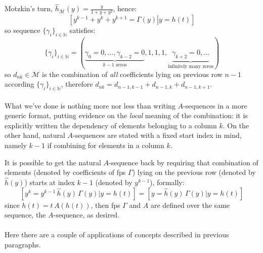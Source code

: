 Motzkin's turn, 
$\hat{h}_{\mathcal{M}}(y) = \frac{y}{1+y+y^2}$, hence:
\begin{displaymath}
        \left.\left[y^{k-1}+y^{k}+y^{k+1}=\Gamma(y)\right| y = h(t) \right]
\end{displaymath}
so sequence $\lbrace \gamma_{i} \rbrace_{i\in\mathbb{N}}$ satisfies:
\begin{displaymath}
    \lbrace \gamma_{i} \rbrace_{i\in\mathbb{N}} = 
        \left(\underbrace{\gamma_{0}=0,\ldots,\gamma_{k-2}=0}_{k-1 \text{ zeros}},
            1,1,1,
            \underbrace{\gamma_{k+2}=0, \ldots}_{\text{infinitely many zeros}} \right)
\end{displaymath}
so $d_{nk}\in\mathcal{M}$ is the combination of \emph{all} coefficients
lying on previous row $n-1$ according $\lbrace \gamma_{i} \rbrace_{i\in\mathbb{N}}$,
therefore $d_{nk}=d_{n-1,k-1}+d_{n-1,k}+d_{n-1,k+1}$.
\\\\
What we've done is nothing more nor less than writing $A$-sequences 
in a more generic format, putting evidence on the \emph{local} meaning 
of the combination: it is explicitly written the dependency of 
elements belonging to a column $k$. On the other hand, natural $A$-sequences 
are stated with a fixed start index in mind, namely $k-1$ if combining 
for elements in a column $k$.

It is possible to get the natural $A$-sequence back by requiring that 
combination of elements (denoted by coefficients of \ac{fps} $\Gamma$)  
lying on the previous row (denoted by $\hat{h}(y)$)
starts at index $k-1$ (denoted by $y^{k-1}$), formally:
\begin{displaymath}
    \left[y^{k} = y^{k-1}\,\hat{h}(y)\,\Gamma(y) \big| y = h(t) \right] = 
    \left[y = \hat{h}(y)\,\Gamma(y) \big| y = h(t) \right]
\end{displaymath}
since $h(t) = t\,A(h(t))$, then \ac{fps}
$\Gamma$ and $A$ are defined over the same sequence, the $A$-sequence, as desired.
\\\\
Here there are a couple of applications of concepts described in previous paragraphs. 

